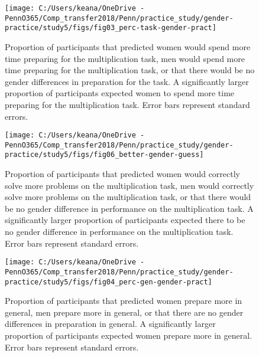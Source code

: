 \documentclass[letterpaper, nobind]{templates/ociamthesis}
\begin{document}
\begin{figure}

{\centering \texttt{[image: C:/Users/keana/OneDrive - PennO365/Comp\_transfer2018/Penn/practice\_study/gender-practice/study5/figs/fig03\_perc-task-gender-pract]} 

}

\caption{Proportion of participants that predicted women would spend more time preparing for the multiplication task, men would spend more time preparing for the multiplication task, or that there would be no gender differences in preparation for the task. A significantly larger proportion of participants expected women to spend more time preparing for the multiplication task. Error bars represent standard errors.}\label{fig:s403}
\end{figure}

\begin{figure}

{\centering \texttt{[image: C:/Users/keana/OneDrive - PennO365/Comp\_transfer2018/Penn/practice\_study/gender-practice/study5/figs/fig06\_better-gender-guess]} 

}

\caption{Proportion of participants that predicted women would correctly solve more problems on the multiplication task, men would correctly solve more problems on the multiplication task, or that there would be no gender difference in performance on the multiplication task. A significantly larger proportion of participants expected there to be no gender difference in performance on the multiplication task. Error bars represent standard errors.}\label{fig:s404}
\end{figure}

\begin{figure}

{\centering \texttt{[image: C:/Users/keana/OneDrive - PennO365/Comp\_transfer2018/Penn/practice\_study/gender-practice/study5/figs/fig04\_perc-gen-gender-pract]} 

}

\caption{Proportion of participants that predicted women prepare more in general, men prepare more in general, or that there are no gender differences in preparation in general. A significantly larger proportion of participants expected women prepare more in general. Error bars represent standard errors.}\label{fig:s406}
\end{figure}
\end{document}
